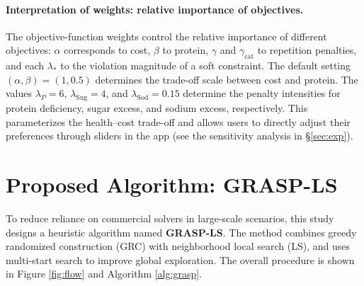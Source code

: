 \documentclass[a4paper]{article}
\begin{document}
\paragraph{Interpretation of weights: relative importance of objectives.}The objective-function weights control the relative importance of different objectives: $\alpha$ corresponds to cost, $\beta$ to protein, $\gamma$ and $\gamma_{\text{cat}}$ to repetition penalties, and each $\lambda_*$ to the violation magnitude of a soft constraint. The default setting $(\alpha,\beta)=(1,0.5)$ determines the trade-off scale between cost and protein. The values $\lambda_P=6$, $\lambda_{\text{Sug}}=4$, and $\lambda_{\text{Sod}}=0.15$ determine the penalty intensities for protein deficiency, sugar excess, and sodium excess, respectively. This parameterizes the health--cost trade-off and allows users to directly adjust their preferences through sliders in the app (see the sensitivity analysis in \S\ref{sec:exp}).

\section{Proposed Algorithm: GRASP-LS}\label{sec:alg}
To reduce reliance on commercial solvers in large-scale scenarios, this study designs a heuristic algorithm named \textbf{GRASP-LS}. The method combines greedy randomized construction (GRC) with neighborhood local search (LS), and uses multi-start search to improve global exploration. The overall procedure is shown in Figure \ref{fig:flow} and Algorithm \ref{alg:grasp}.
\end{document}
